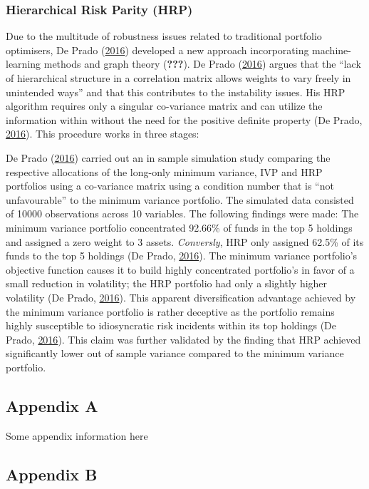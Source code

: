 \documentclass[11pt,preprint, authoryear]{elsarticle}
\numberwithin{equation}{section}
\numberwithin{figure}{section}
\numberwithin{table}{section}
\begin{document}
\hypertarget{hierarchical-risk-parity-hrp}{%
\subsubsection{Hierarchical Risk Parity
(HRP)}\label{hierarchical-risk-parity-hrp}}

Due to the multitude of robustness issues related to traditional
portfolio optimisers, De Prado (\protect\hyperlink{ref-lopez}{2016})
developed a new approach incorporating machine-learning methods and
graph theory ({\textbf{???}}). De Prado
(\protect\hyperlink{ref-lopez}{2016}) argues that the ``lack of
hierarchical structure in a correlation matrix allows weights to vary
freely in unintended ways'' and that this contributes to the instability
issues. His HRP algorithm requires only a singular co-variance matrix
and can utilize the information within without the need for the positive
definite property (De Prado, \protect\hyperlink{ref-lopez}{2016}). This
procedure works in three stages:

De Prado (\protect\hyperlink{ref-lopez}{2016}) carried out an in sample
simulation study comparing the respective allocations of the long-only
minimum variance, IVP and HRP portfolios using a co-variance matrix
using a condition number that is ``not unfavourable'' to the minimum
variance portfolio. The simulated data consisted of 10000 observations
across 10 variables. The following findings were made: The minimum
variance portfolio concentrated 92.66\% of funds in the top 5 holdings
and assigned a zero weight to 3 assets. \emph{Conversly}, HRP only
assigned 62.5\% of its funds to the top 5 holdings (De Prado,
\protect\hyperlink{ref-lopez}{2016}). The minimum variance portfolio's
objective function causes it to build highly concentrated portfolio's in
favor of a small reduction in volatility; the HRP portfolio had only a
slightly higher volatility (De Prado,
\protect\hyperlink{ref-lopez}{2016}). This apparent diversification
advantage achieved by the minimum variance portfolio is rather deceptive
as the portfolio remains highly susceptible to idiosyncratic risk
incidents within its top holdings (De Prado,
\protect\hyperlink{ref-lopez}{2016}). This claim was further validated
by the finding that HRP achieved significantly lower out of sample
variance compared to the minimum variance portfolio.

\hypertarget{appendix-a}{%
\subsection*{Appendix A}\label{appendix-a}}

Some appendix information here

\hypertarget{appendix-b}{%
\subsection*{Appendix B}\label{appendix-b}}


\end{document}
